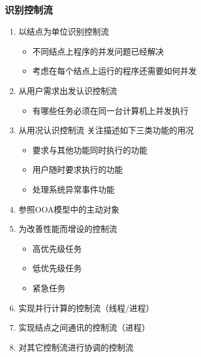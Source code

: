 \documentclass[compress]{beamer}
\begin{document}
\begin{frame}
  \frametitle{识别控制流}
   {
  \begin{enumerate}
    \item 以结点为单位识别控制流
      \begin{itemize}
        \item 不同结点上程序的并发问题已经解决
        \item 考虑在每个结点上运行的程序还需要如何并发 
      \end{itemize}
    \item 从用户需求出发认识控制流
      \begin{itemize}
        \item 有哪些任务必须在同一台计算机上并发执行 
      \end{itemize}
    \item 从用况认识控制流  关注描述如下三类功能的用况
      \begin{itemize}
        \item 要求与其他功能同时执行的功能
        \item 用户随时要求执行的功能
        \item 处理系统异常事件功能
      \end{itemize}
  \end{enumerate}
  }

   {
    \begin{enumerate}
    \setcounter{enumi}{3}
      \item 参照OOA模型中的主动对象
      \item 为改善性能而增设的控制流
        \begin{itemize}
          \item 高优先级任务
          \item 低优先级任务
          \item 紧急任务
        \end{itemize}
      \item 实现并行计算的控制流（线程/进程）
      \item 实现结点之间通讯的控制流（进程）
      \item 对其它控制流进行协调的控制流
    \end{enumerate}
  }

\end{frame}
\end{document}
